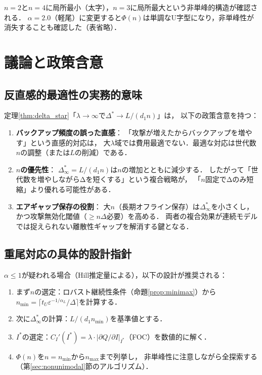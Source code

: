 \documentclass[12pt,a4paper]{article}
\theoremstyle{plain}
\theoremstyle{definition}
\theoremstyle{remark}
\newcommand{\Dopt}{\Delta^*}
\begin{document}
$n=2$と$n=4$に局所最小（太字），$n=3$に局所最大という非単峰的構造が確認される．
$\alpha=2.0$（軽尾）に変更すると$\Phi(n)$は単調なU字型になり，非単峰性が消失することも確認した（表省略）．

\section{議論と政策含意}
\label{sec:discussion}

\subsection{反直感的最適性の実務的意味}

定理\ref{thm:delta_star}「$\lambda\to\infty$で$\Dopt\to L/(d_1 n)$」は，
以下の政策含意を持つ：

\begin{enumerate}
\item \textbf{バックアップ頻度の誤った直感}：
  「攻撃が増えたからバックアップを増やす」という直感的対応は，
  大$\lambda$域では費用最適でない．最適な対応は世代数$n$の調整（または$L$の削減）である．
  
\item \textbf{$n$の優先性}：
  $\Dopt_\infty=L/(d_1 n)$は$n$の増加とともに減少する．
  したがって「世代数を増やしながらΔを短くする」という複合戦略が，
  「$n$固定でΔのみ短縮」より優れる可能性がある．
  
\item \textbf{エアギャップ保存の役割}：
  大$n$（長期オフライン保存）は$\Dopt_\infty$を小さくし，
  かつ攻撃無効化閾値（$\ge n\Delta$必要）を高める．
  両者の複合効果が連続モデルでは捉えられない離散性ギャップを解消する鍵となる．
\end{enumerate}

\subsection{重尾対応の具体的設計指針}

$\alpha\le1$が疑われる場合（Hill推定量による），以下の設計が推奨される：

\begin{enumerate}
\item まず$n$の選定：ロバスト継続性条件（命題\ref{prop:minimax}）から
  $n_{\min}=\lceil t_U\varepsilon^{-1/\alpha_L}/\Delta\rceil$を計算する．
\item 次に$\Dopt_\infty$の計算：$L/(d_1 n_{\min})$を基準値とする．
\item $I^*$の選定：$C_I'(I^*)=\lambda\cdot|\partial Q/\partial I|_{I^*}$（FOC）を数値的に解く．
\item $\Phi(n)$を$n=n_{\min}$から$n_{\max}$まで列挙し，
  非単峰性に注意しながら全探索する（第\ref{sec:nonunimodal}節のアルゴリズム）．
\end{enumerate}
\end{document}
